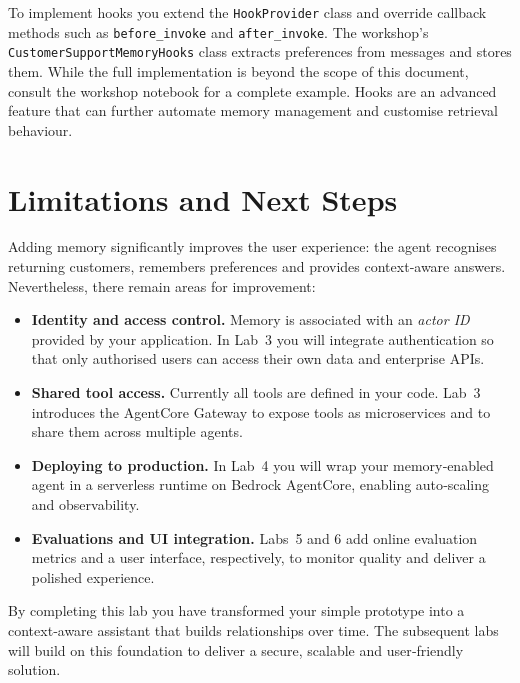 To implement hooks you extend the \texttt{HookProvider} class and
override callback methods such as \texttt{before\_invoke} and
\texttt{after\_invoke}.  The workshop’s \texttt{CustomerSupportMemoryHooks}
class extracts preferences from messages and stores them.  While the full
implementation is beyond the scope of this document, consult the workshop
notebook for a complete example.  Hooks are an advanced feature that can
further automate memory management and customise retrieval behaviour.

\section{Limitations and Next Steps}

Adding memory significantly improves the user experience: the agent
recognises returning customers, remembers preferences and provides
context‑aware answers.  Nevertheless, there remain areas for
improvement:

\begin{itemize}
  \item \textbf{Identity and access control.}  Memory is associated with an
        \emph{actor ID} provided by your application.  In Lab 3 you will
        integrate authentication so that only authorised users can access
        their own data and enterprise APIs.
  \item \textbf{Shared tool access.}  Currently all tools are defined in
        your code.  Lab 3 introduces the AgentCore Gateway to expose tools
        as microservices and to share them across multiple agents.
  \item \textbf{Deploying to production.}  In Lab 4 you will wrap your
        memory‑enabled agent in a serverless runtime on Bedrock
        AgentCore, enabling auto‑scaling and observability.
  \item \textbf{Evaluations and UI integration.}  Labs 5 and 6 add online
        evaluation metrics and a user interface, respectively, to monitor
        quality and deliver a polished experience.
\end{itemize}

By completing this lab you have transformed your simple prototype into a
context‑aware assistant that builds relationships over time.  The
subsequent labs will build on this foundation to deliver a secure,
scalable and user‑friendly solution.



